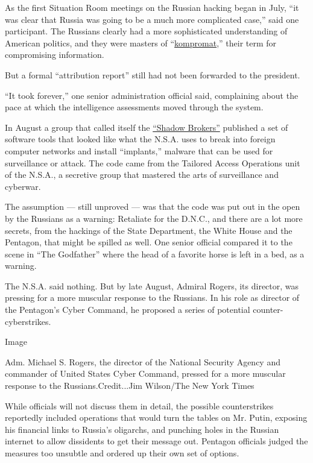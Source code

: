 As the first Situation Room meetings on the Russian hacking began in
July, ``it was clear that Russia was going to be a much more complicated
case,'' said one participant. The Russians clearly had a more
sophisticated understanding of American politics, and they were masters
of
``\href{http://www.nytimes.com/2016/12/09/world/europe/vladimir-putin-russia-fake-news-hacking-cybersecurity.html}{kompromat},''
their term for compromising information.

But a formal ``attribution report'' still had not been forwarded to the
president.

``It took forever,'' one senior administration official said,
complaining about the pace at which the intelligence assessments moved
through the system.

In August a group that called itself the
\href{https://www.nytimes.com/2016/08/17/us/shadow-brokers-leak-raises-alarming-question-was-the-nsa-hacked.html}{``Shadow
Brokers''} published a set of software tools that looked like what the
N.S.A. uses to break into foreign computer networks and install
``implants,'' malware that can be used for surveillance or attack. The
code came from the Tailored Access Operations unit of the N.S.A., a
secretive group that mastered the arts of surveillance and cyberwar.

The assumption --- still unproved --- was that the code was put out in
the open by the Russians as a warning: Retaliate for the D.N.C., and
there are a lot more secrets, from the hackings of the State Department,
the White House and the Pentagon, that might be spilled as well. One
senior official compared it to the scene in ``The Godfather'' where the
head of a favorite horse is left in a bed, as a warning.

The N.S.A. said nothing. But by late August, Admiral Rogers, its
director, was pressing for a more muscular response to the Russians. In
his role as director of the Pentagon's Cyber Command, he proposed a
series of potential counter-cyberstrikes.

Image

Adm. Michael S. Rogers, the director of the National Security Agency and
commander of United States Cyber Command, pressed for a more muscular
response to the Russians.Credit...Jim Wilson/The New York Times

While officials will not discuss them in detail, the possible
counterstrikes reportedly included operations that would turn the tables
on Mr. Putin, exposing his financial links to Russia's oligarchs, and
punching holes in the Russian internet to allow dissidents to get their
message out. Pentagon officials judged the measures too unsubtle and
ordered up their own set of options.

